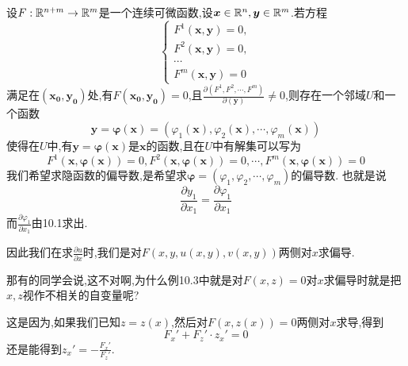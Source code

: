 \begin{solution}
\begin{remark}
\begin{theorem}
            设$F:\mathbb{R}^{n+m} \to \mathbb{R}^m$是一个连续可微函数,设$\bm x \in \mathbb{R}^{n},\bm y \in \mathbb{R}^m$.若方程
            $$\begin{cases}
                F^1(\bm x, \bm y) = 0,\\
                F^2(\bm x, \bm y) = 0,\\
                \cdots\\
                F^m(\bm x, \bm y) = 0
            \end{cases}
            $$
            满足在$(\bm {x_0},\bm {y_0})$处,有$F(\bm {x_0},\bm {y_0}) = 0$,且$\frac{\partial (F^1,F^2,\cdots,F^m)}{\partial (\bm y)} \neq 0$,则存在一个邻域$U$和一个函数$$\bm y = \bm \varphi(\bm x) = (\varphi_1(\bm x), \varphi_2(\bm x), \cdots, \varphi_m(\bm x))
            $$
            使得在$U$中,有$\bm y = \bm \varphi(\bm x)$是$\bm x$的函数,且在$U$中有解集可以写为
            \begin{equation}\label{eq:implicit}
                F^1(\bm x, \bm \varphi(\bm x)) = 0, F^2(\bm x, \bm \varphi(\bm x)) = 0, \cdots, F^m(\bm x, \bm \varphi(\bm x)) = 0
            \end{equation}
            我们希望求隐函数的偏导数,是希望求$\bm \varphi = (\varphi_1, \varphi_2, \cdots, \varphi_m)$的偏导数.
            也就是说
            $$\frac{\partial y_1}{\partial x_1} = \frac{\partial \varphi_1}{\partial x_1} $$
            而$\frac{\partial \varphi_1}{\partial x_1}$由10.1求出.
        \end{theorem}
        因此我们在求$\frac{\partial u}{\partial x}$时,我们是对$F(x,y,u(x,y),v(x,y))$两侧对$x$求偏导.
    \end{remark}
    \begin{remark}
        那有的同学会说,这不对啊,为什么例10.3中就是对$F(x,z)=0$对$x$求偏导时就是把$x,z$视作不相关的自变量呢?
        
        这是因为,如果我们已知$z=z(x)$,然后对$F(x,z(x)) = 0$两侧对$x$求导,得到
        $$F_x' + F_z' \cdot z_x' = 0$$
        还是能得到$z_x' = -\frac{F_x'}{F_z'}$.


\end{remark}
\end{solution}
